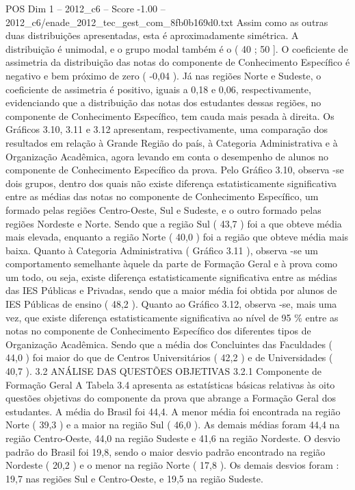 \begin{textsample}{POS Dim 1 – 2012\_c6 – Score -1.00 – 2012\_c6/enade\_2012\_tec\_gest\_com\_8fb0b169d0.txt}
Assim como as outras duas distribuições apresentadas, esta é aproximadamente simétrica.
A distribuição é unimodal, e o grupo modal também é o ( 40 ; 50 ].
O coeficiente de assimetria da distribuição das notas do componente de Conhecimento Específico é negativo e bem próximo de zero ( -0,04 ).
Já nas regiões Norte e Sudeste, o coeficiente de assimetria é positivo, iguais a 0,18 e 0,06, respectivamente, evidenciando que a distribuição das notas dos estudantes dessas regiões, no componente de Conhecimento Específico, tem cauda mais pesada à direita.
Os Gráficos 3.10, 3.11 e 3.12 apresentam, respectivamente, uma comparação dos resultados em relação à Grande Região do país, à Categoria Administrativa e à Organização Acadêmica, agora levando em conta o desempenho de alunos no componente de Conhecimento Específico da prova.
Pelo Gráfico 3.10, observa -se dois grupos, dentro dos quais não existe diferença estatisticamente significativa entre as médias das notas no componente de Conhecimento Específico, um formado pelas regiões Centro-Oeste, Sul e Sudeste, e o outro formado pelas regiões Nordeste e Norte.
Sendo que a região Sul ( 43,7 ) foi a que obteve média mais elevada, enquanto a região Norte ( 40,0 ) foi a região que obteve média mais baixa.
Quanto à Categoria Administrativa ( Gráfico 3.11 ), observa -se um comportamento semelhante àquele da parte de Formação Geral e à prova como um todo, ou seja, existe diferença estatisticamente significativa entre as médias das IES Públicas e Privadas, sendo que a maior média foi obtida por alunos de IES Públicas de ensino ( 48,2 ).
Quanto ao Gráfico 3.12, observa -se, mais uma vez, que existe diferença estatisticamente significativa ao nível de 95 \% entre as notas no componente de Conhecimento Específico dos diferentes tipos de Organização Acadêmica.
Sendo que a média dos Concluintes das Faculdades ( 44,0 ) foi maior do que de Centros Universitários ( 42,2 ) e de Universidades ( 40,7 ). 3.2 ANÁLISE DAS QUESTÕES OBJETIVAS 3.2.1 Componente de Formação Geral A Tabela 3.4 apresenta as estatísticas básicas relativas às oito questões objetivas do componente da prova que abrange a Formação Geral dos estudantes.
A média do Brasil foi 44,4.
A menor média foi encontrada na região Norte ( 39,3 ) e a maior na região Sul ( 46,0 ).
As demais médias foram 44,4 na região Centro-Oeste, 44,0 na região Sudeste e 41,6 na região Nordeste.
O desvio padrão do Brasil foi 19,8, sendo o maior desvio padrão encontrado na região Nordeste ( 20,2 ) e o menor na região Norte ( 17,8 ).
Os demais desvios foram : 19,7 nas regiões Sul e Centro-Oeste, e 19,5 na região Sudeste.

\end{textsample}
